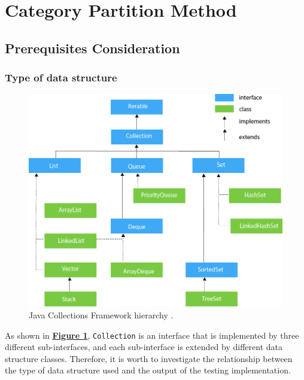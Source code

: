 \documentclass[12pt, a4paper]{article}
\begin{document}



\section{Category Partition Method}
\subsection{Prerequisites Consideration}
\subsubsection{Type of data structure}
\begin{figure}[H]
  \centering
  \includegraphics[width=.7\textwidth]{images/java-collection-hierarchy.png}
  \caption{Java Collections Framework hierarchy \cite{java_collection_hierarchy}.}
  \label{figure:collection_hierarchy}
\end{figure}

As shown in \hyperref[figure:collection_hierarchy]{\textbf{Figure
\ref*{figure:collection_hierarchy}}}, \texttt{Collection} is an interface that is implemented by
three different sub-interfaces, and each sub-interface is extended by different data structure
classes. Therefore, it is worth to investigate the relationship between the type of data structure
used and the output of the testing implementation.
\end{document}
